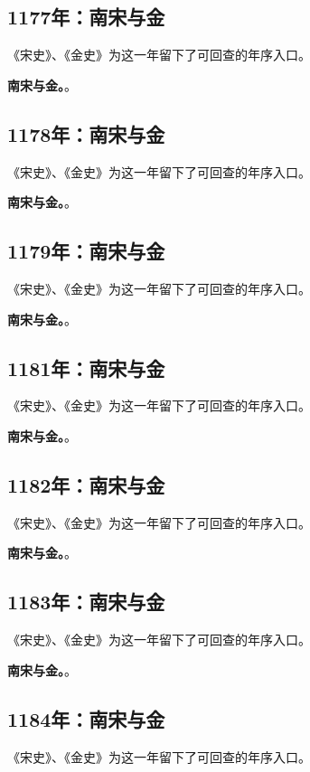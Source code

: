 \subsection{1177年：南宋与金}
《宋史》、《金史》为这一年留下了可回查的年序入口。

\noindent\textbf{南宋与金。}。

\subsection{1178年：南宋与金}
《宋史》、《金史》为这一年留下了可回查的年序入口。

\noindent\textbf{南宋与金。}。

\subsection{1179年：南宋与金}
《宋史》、《金史》为这一年留下了可回查的年序入口。

\noindent\textbf{南宋与金。}。

\subsection{1181年：南宋与金}
《宋史》、《金史》为这一年留下了可回查的年序入口。

\noindent\textbf{南宋与金。}。

\subsection{1182年：南宋与金}
《宋史》、《金史》为这一年留下了可回查的年序入口。

\noindent\textbf{南宋与金。}。

\subsection{1183年：南宋与金}
《宋史》、《金史》为这一年留下了可回查的年序入口。

\noindent\textbf{南宋与金。}。

\subsection{1184年：南宋与金}
《宋史》、《金史》为这一年留下了可回查的年序入口。

